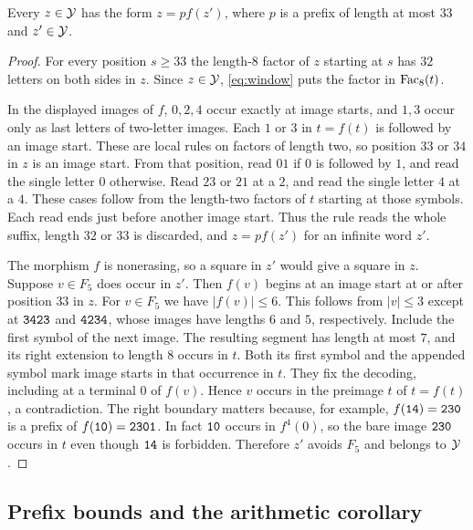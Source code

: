 \begin{lemma}\label{lem:five}
Every \(z\in\mathcal Y\) has the form \(z=p f(z')\), where \(p\) is a
prefix of length at most \(33\) and \(z'\in\mathcal Y\).
\end{lemma}

\begin{proof}
For every position \(s\ge33\) the length-\(8\) factor of \(z\)
starting at \(s\) has \(32\) letters on both sides in \(z\).
Since \(z\in\mathcal Y\), \eqref{eq:window} puts the factor in \(\operatorname{Fac}_8(t)\).

In the displayed images of \(f\), \(0,2,4\) occur exactly at image
starts, and \(1,3\) occur only as last letters of two-letter images.
Each \(1\) or \(3\) in \(t=f(t)\) is followed by an image start.
These are local rules on factors of length two, so position \(33\)
or \(34\) in \(z\) is an image start. From that position, read \(01\)
if \(0\) is followed by \(1\), and read the single letter \(0\)
otherwise. Read \(23\) or \(21\) at a \(2\), and read the single
letter \(4\) at a \(4\). These cases follow from the length-two
factors of \(t\) starting at those symbols. Each read ends just
before another image start. Thus the rule reads the whole suffix,
length \(32\) or \(33\) is discarded, and \(z=p f(z')\) for an
infinite word \(z'\).

The morphism \(f\) is nonerasing, so a square in \(z'\) would give
a square in \(z\). Suppose \(v\in F_5\) does occur in \(z'\).
Then \(f(v)\) begins at an image start at or after position \(33\)
in \(z\). For \(v\in F_5\) we have \(|f(v)|\le6\). This follows
from \(|v|\le3\) except at \(\mathtt{3423}\) and \(\mathtt{4234}\),
whose images have lengths \(6\) and \(5\), respectively.
Include the first symbol of the next image. The resulting
segment has length at most \(7\), and its right extension to
length \(8\) occurs in \(t\). Both its first symbol and the
appended symbol mark image starts in that occurrence in \(t\).
They fix the decoding, including at a terminal \(0\) of \(f(v)\).
Hence \(v\) occurs in the preimage \(t\) of \(t=f(t)\), a
contradiction. The right boundary matters because, for example,
\(f(\mathtt{14})=\mathtt{230}\) is a prefix of
\(f(\mathtt{10})=\mathtt{2301}\). In fact \(\mathtt{10}\) occurs
in \(f^4(0)\), so the bare image \(\mathtt{230}\) occurs in \(t\)
even though \(\mathtt{14}\) is forbidden. Therefore \(z'\) avoids
\(F_5\) and belongs to \(\mathcal Y\).
\end{proof}

\subsection{Prefix bounds and the arithmetic corollary}\label{sec:arithmetic}

